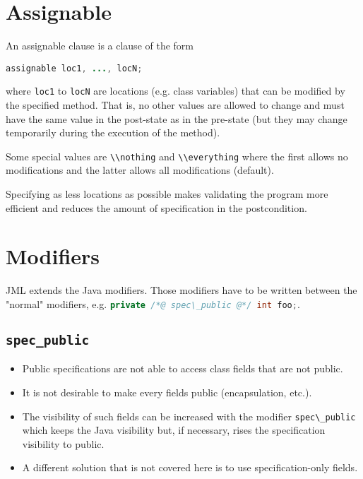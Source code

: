 \documentclass[a4paper, 11pt, accentcolor = tud3b]{tudreport}
\newcommand{\inlineJava}[1]{\lstinline[language = Java]|#1|}
\begin{document}
		\section{Assignable}
			An assignable clause is a clause of the form
			\begin{center}
				\inlineJava{assignable loc1, ..., locN;}
			\end{center}
			where \texttt{loc1} to \texttt{locN} are locations (e.g. class variables) that can be modified by the specified method. That is, no other values are allowed to change and must have the same value in the post-state as in the pre-state (but they may change temporarily during the execution of the method).
			
			Some special values are \inlineJava{\\nothing} and \inlineJava{\\everything} where the first allows no modifications and the latter allows all modifications (default).
			
			Specifying as less locations as possible makes validating the program more efficient and reduces the amount of specification in the postcondition.

		\section{Modifiers}
			\label{sec:additionalmod}
		
			JML extends the Java modifiers. Those modifiers have to be written between the "normal" modifiers, e.g. \inlineJava{private /*@ spec\_public @*/ int foo;}.
		
			\subsection{\texttt{spec\_public}}
				\label{sec:specpub}
			
				\begin{itemize}
					\item Public specifications are not able to access class fields that are not public.
					\item It is not desirable to make every fields public (encapsulation, etc.).
					\item The visibility of such fields can be increased with the modifier \inlineJava{spec\_public} which keeps the Java visibility but, if necessary, rises the specification visibility to public.
					\item A different solution that is not covered here is to use specification-only fields.
				\end{itemize}
\end{document}

